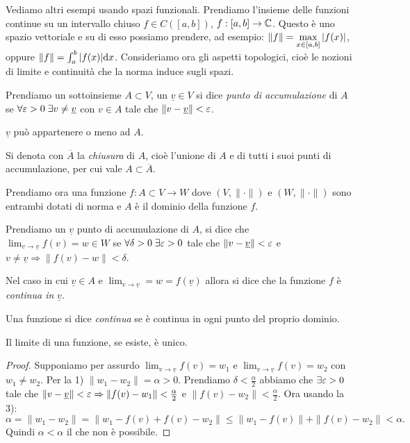 Vediamo altri esempi usando spazi funzionali. Prendiamo l'insieme delle
funzioni continue su un intervallo chiuso $f \in C\left( [a, b] \right)$,
$f: [a, b] \to \mathbb C$. Questo è uno spazio vettoriale e su di esso possiamo
prendere, ad esempio: $\|f\| = \displaystyle \max_{x \in [a, b]} {\left|f(x)\right|}$,
oppure $\|f\| = \int_a^b {\left|f(x)\right|} \mathrm{d} x$.
Consideriamo ora gli aspetti topologici, cioè le nozioni di limite e continuità
che la norma induce sugli spazi.
\begin{definition}
Prendiamo un sottoinsieme $A \subset V$, un $\underline{v} \in V$ si dice
\emph{punto di accumulazione} di $A$ se $\forall \varepsilon > 0 \; \exists v \neq
\underline{v}$ con $v \in A$ tale che  $\|v - \underline{v}\| < \varepsilon$. 
\end{definition}
\begin{remark}
$\underline{v}$ può appartenere o meno ad $A$.
\end{remark}
\begin{definition}
Si denota con $\overline{A}$ la \emph{chiusura} di $A$, cioè l'unione di $A$ e
di tutti i suoi punti di accumulazione, per cui vale $A \subset \overline{A}$.
\end{definition}
Prendiamo ora una funzione $f: A \subset V \to W$ dove $\left(V, \| \cdot \| 
\right)$ e $\left(W, \| \cdot \| \right)$ sono entrambi dotati di norma e $A$ è
il dominio della funzione $f$.
\begin{definition}
Prendiamo un $\underline{v}$ punto di accumulazione di $A$, si dice che 
$\displaystyle \lim_{v \to \underline{v}} f(v) = w \in W$ se 
$\forall \delta > 0 \; \exists \varepsilon > 0$ tale che $ \|v - \underline{v}\| <
\varepsilon$ e $v \neq \underline{v} \Rightarrow \|f(v) - w\| < \delta$.
\end{definition}
\begin{definition}
Nel caso in cui $\underline{v} \in A$ e $\displaystyle \lim_{v \to 
\underline{v}} = w = f(\underline{v})$ allora si dice che la funzione $f$ è
\emph{continua in} $\underline{v}$.
\end{definition}
\begin{definition}[continuità]
Una funzione si dice \emph{continua} se è continua in ogni punto del proprio
dominio.
\end{definition}
\begin{theorem}
Il limite di una funzione, se esiste, è unico.
\end{theorem}
\begin{proof}
Supponiamo per assurdo $\displaystyle \lim_{v \to \underline{v}} f(v) = w_1$
e $\displaystyle \lim_{v \to \underline{v}} f(v) = w_2$ con $w_1 \neq w_2$.
Per la 1) $\|w_1 - w_2\| = \alpha > 0$. Prendiamo $\delta < \frac{\alpha}{2}$
abbiamo che $\exists \varepsilon > 0$ tale che $\|v - \underline{v}\| < \varepsilon
\Rightarrow \|f(v) - w_1\| < \frac{\alpha}{2}$ e $\|f(v) - w_2\| <
\frac{\alpha}{2}$. Ora usando la 3):
\[
	\alpha = \|w_1 - w_2\| = \|w_1 - f(v) + f(v) - w_2\| \leq \|w_1 - f(v)\| +
	\|f(v) - w_2\| < \alpha
.\] 
Quindi $\alpha < \alpha$ il che non è possibile.
\end{proof}

